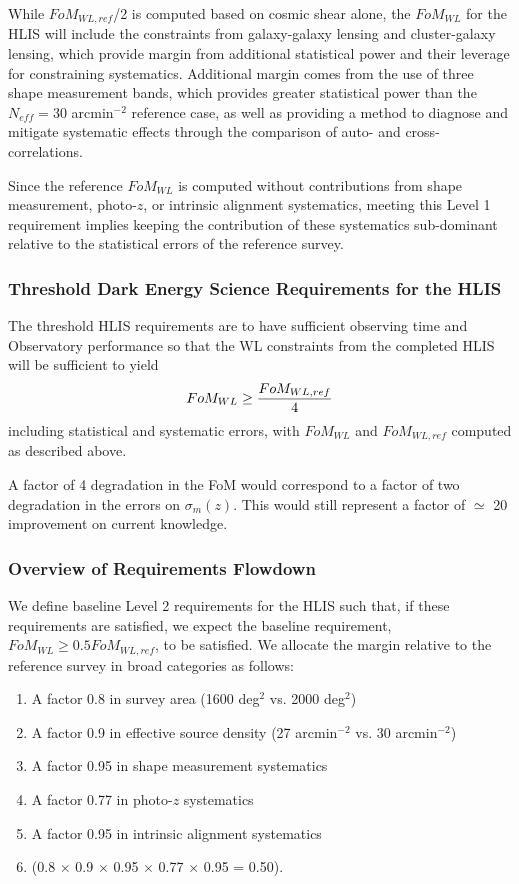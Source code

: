 While $FoM_{WL,ref}$/2 is computed based on cosmic shear alone, the $FoM_{WL}$
for the HLIS will include the constraints from galaxy-galaxy lensing and
cluster-galaxy lensing, which provide margin from additional statistical power
and their leverage for constraining systematics.  Additional margin comes from
the use of three shape measurement bands, which provides greater statistical
power than the $N_{eff}= 30$ arcmin$^{-2}$ reference case, as well as providing a method
to diagnose and mitigate systematic effects through the comparison of auto- and
cross-correlations.

Since the reference $FoM_{WL}$ is computed without contributions from shape
measurement, photo-$z$, or intrinsic alignment systematics, meeting this Level 1
requirement implies keeping the contribution of these systematics sub-dominant
relative to the statistical errors of the reference survey.

\subsubsection{Threshold Dark Energy Science Requirements for the HLIS}

The threshold HLIS requirements are to have sufficient observing time and
Observatory performance so that the WL constraints from the completed HLIS will
be sufficient to yield
\begin{eqnarray}
FoM_{WL}\geq {FoM_{WL,ref}\over 4}
\end{eqnarray}
including statistical and systematic errors, with $FoM_{WL}$ and $FoM_{WL,ref}$ computed as described above.

A factor of 4 degradation in the FoM would correspond to a factor of two
degradation in the errors on $\sigma_m(z)$.  This would still represent a factor
of $\simeq$ 20 improvement on current knowledge.

\subsubsection{Overview of Requirements Flowdown}

We define baseline Level 2 requirements for the HLIS such that, if these
requirements are satisfied, we expect the baseline requirement, $FoM_{WL}\geq
0.5 FoM_{WL,ref}$, to be satisfied. We allocate the margin relative to the
reference survey in broad categories as follows:
\begin{enumerate}
\item	A factor 0.8 in survey area (1600 deg$^2$ vs. 2000 deg$^2$)
\item	A factor 0.9 in effective source density (27 arcmin$^{-2}$ vs. 30 arcmin$^{-2}$)
\item	A factor 0.95 in shape measurement systematics
\item	A factor 0.77 in photo-$z$ systematics
\item	A factor 0.95 in intrinsic alignment systematics
\item (0.8 $\times$ 0.9 $\times$ 0.95 $\times$ 0.77 $\times$ 0.95 = 0.50).
\end{enumerate}


